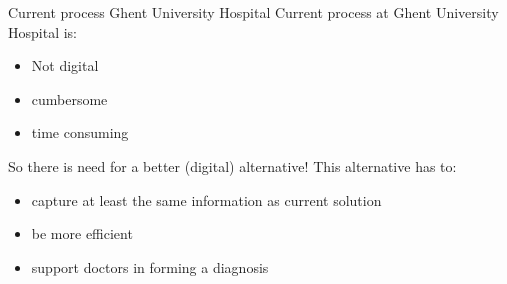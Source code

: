 \documentclass[english]{beamer}
\begin{document}
\begin{frame}{Current process Ghent University Hospital}
	Current process at Ghent University Hospital is:
	\begin{itemize}
		\item Not digital
		\item cumbersome
		\item time consuming
	\end{itemize}
\end{frame}



\begin{frame}
	So there is need for a better (digital) alternative! This alternative has to:
	\begin{itemize}
		\item capture at least the same information as current solution
		\item be more efficient
		\item support doctors in forming a diagnosis
	\end{itemize}
\end{frame}
\end{document}
